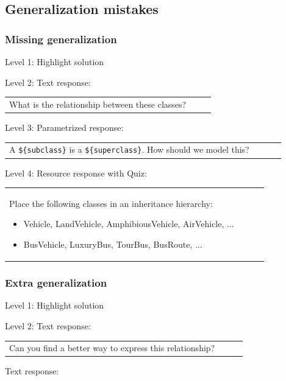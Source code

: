 \subsection{Generalization mistakes}

\subsubsection{Missing generalization}

\noindent Level 1: Highlight solution \medskip

\noindent Level 2: Text response: \medskip

\begin{tabular}{|p{0.9\linewidth}}
What is the relationship between these classes?
\end{tabular} \medskip

\noindent Level 3: Parametrized response: \medskip

\begin{tabular}{|p{0.9\linewidth}}
A \verb|${subclass}| is a \verb|${superclass}|. How should we model this?
\end{tabular} \medskip

\noindent Level 4: Resource response with Quiz: \medskip

\begin{tabular}{|p{0.9\linewidth}}
Place the following classes in an inheritance hierarchy:

\begin{itemize}
    \item Vehicle, LandVehicle, AmphibiousVehicle, AirVehicle, ...
    \item BusVehicle, LuxuryBus, TourBus, BusRoute, ...
\end{itemize}

\end{tabular} \medskip


\subsubsection{Extra generalization}

\noindent Level 1: Highlight solution \medskip

\noindent Level 2: Text response: \medskip

\begin{tabular}{|p{0.9\linewidth}}
Can you find a better way to express this relationship?
\end{tabular} \medskip

Text response: \medskip

